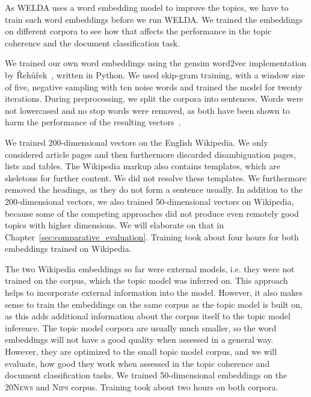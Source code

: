 \documentclass[
        a4paper,
        titlepage,
        twoside,
        parskip,
        numbers=noenddot
        ]{scrbook}
\theoremstyle{break}
\begin{document}
As WELDA uses a word embedding model to improve the topics, we have to train such word embeddings before we run WELDA.
We trained the embeddings on different corpora to see how that affects the performance in the topic coherence and the document classification task.

We trained our own word embeddings using the gensim word2vec implementation by {\v R}eh{\r u}{\v r}ek~\cite{Rehurek2010}, written in Python.
We used skip-gram training, with a window size of five, negative sampling with ten noise words and trained the model for twenty iterations.
During preprocessing, we split the corpora into sentences.
Words were not lowercased and no stop words were removed, as both have been shown to harm the performance of the resulting vectors~\cite{Mikolov2013d}.

We trained 200-dimensional vectors on the English Wikipedia.
We only considered article pages and then furthermore discarded disambiguation pages, lists and tables.
The Wikipedia markup also contains templates, which are skeletons for further content.
We did not resolve these templates.
We furthermore removed the headings, as they do not form a sentence usually.
In addition to the 200-dimensional vectors, we also trained 50-dimensional vectors on Wikipedia, because some of the competing approaches did not produce even remotely good topics with higher dimensions.
We will elaborate on that in Chapter~\ref{sec:comparative_evaluation}.
Training took about four hours for both embeddings trained on Wikipedia.

The two Wikipedia embeddings so far were external models, i.e. they were not trained on the corpus, which the topic model was inferred on.
This approach helps to incorporate external information into the model.
However, it also makes sense to train the embeddings on the same corpus as the topic model is built on, as this adds additional information about the corpus itself to the topic model inference.
The topic model corpora are usually much smaller, so the word embeddings will not have a good quality when assessed in a general way.
However, they are optimized to the small topic model corpus, and we will evaluate, how good they work when assessed in the topic coherence and document classification tasks.
We trained 50-dimensional embeddings on the \textsc{20News} and \textsc{Nips} corpus.
Training took about two hours on both corpora.
\end{document}
